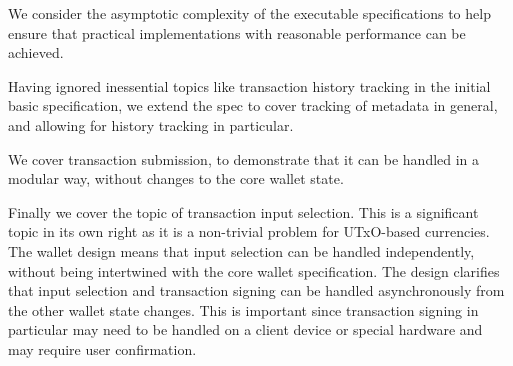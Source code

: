 \documentclass{article}
\theoremstyle{definition}{
  \newtheorem{lemma}{Lemma}[section] %
  \newtheorem{definition}[lemma]{Definition}
}
\theoremstyle{theorem}{
  \newtheorem{invariant}[lemma]{Invariant}
  \newtheorem{proofobligation}[lemma]{Proof Obligation}
}
\numberwithin{equation}{lemma}
\begin{document}
We consider the asymptotic complexity of the executable specifications to
help ensure that practical implementations with reasonable performance can be
achieved.

Having ignored inessential topics like transaction history tracking in the
initial basic specification, we extend the spec to cover tracking of metadata in
general, and allowing for history tracking in particular.

We cover transaction submission, to demonstrate that it can be handled in a
modular way, without changes to the core wallet state.

Finally we cover the topic of transaction input selection. This is a
significant topic in its own right as it is a non-trivial problem for UTxO-based
currencies. The wallet design means that input selection can be handled
independently, without being intertwined with the core wallet specification.
The design clarifies that input selection and transaction signing can be
handled asynchronously from the other wallet state changes. This is important
since transaction signing in particular may need to be handled on a client
device or special hardware and may require user confirmation.

\pagebreak
\tableofcontents
\listoffigures
\pagebreak
\end{document}
